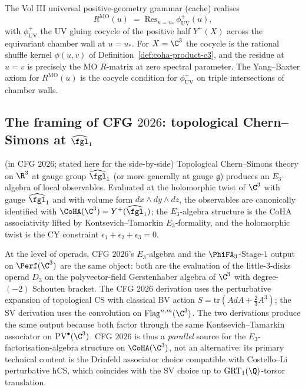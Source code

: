\begin{remark}
\label{rem:mo-r-matrix-residue-wave10}
The Vol III universal positive-geometry grammar (cache) realises
\[
 R^{\mathrm{MO}}(u) \;=\; \mathrm{Res}_{u = u_*}\,
 \phi^+_{\mathrm{UV}}(u),
\]
with $\phi^+_{\mathrm{UV}}$ the UV gluing cocycle of the positive half
$Y^+(X)$ across the equivariant chamber wall at $u = u_*$. For
$X = \C^3$ the cocycle is the rational shuffle kernel $\phi(u, v)$ of
Definition~\ref{def:coha-product-c3}, and the residue at $u = v$ is
precisely the MO $R$-matrix at zero spectral parameter.  The Yang--Baxter
axiom for $R^{\mathrm{MO}}(u)$ is the cocycle condition for
$\phi^+_{\mathrm{UV}}$ on triple intersections of chamber walls.
\end{remark}

\subsection*{The framing of CFG $2026$: topological Chern--Simons at $\widehat{\fgl}_1$}

\begin{theorem}
\label{thm:cfg-2026-tcs-coha-wave10}
\ClaimStatusProvedElsewhere\textup{ (in CFG $2026$; stated here for the
side-by-side)}
Topological Chern--Simons theory on $\R^3$ at gauge group
$\widehat{\fgl}_1$ (or more generally at gauge $\mathfrak g$) produces
an $E_3$-algebra of local observables. Evaluated at the holomorphic
twist of $\C^3$ with gauge $\widehat{\fgl}_1$ and with volume form $dx \wedge dy \wedge dz$,
the observables are canonically identified with $\CoHA(\C^3) =
Y^+(\widehat{\fgl}_1)$; the $E_3$-algebra structure is the CoHA
associativity lifted by Kontsevich--Tamarkin $E_3$-formality, and the
holomorphic twist is the CY constraint $\epsilon_1 + \epsilon_2 +
\epsilon_3 = 0$.
\end{theorem}

\begin{remark}
\label{rem:cfg-2026-operadic-identification-wave10}
At the level of operads, CFG $2026$'s $E_3$-algebra and the
$\PhiFA_3$-Stage-$1$ output on $\Perf(\C^3)$ are the same object:
both are the evaluation of the little-$3$-disks operad $D_3$ on the
polyvector-field Gerstenhaber algebra of $\C^3$ with degree-$(-2)$
Schouten bracket. The CFG $2026$ derivation uses the perturbative
expansion of topological CS with classical BV action
$S = \mathrm{tr}(A dA + \tfrac{2}{3} A^3)$; the SV derivation uses the
convolution on $\mathrm{Flag}^{n, m}(\C^3)$. The two derivations
produce the same output because both factor through the same
Kontsevich--Tamarkin associator on $\mathrm{PV}^\bullet(\C^3)$. CFG $2026$
is thus a \emph{parallel} source for the $E_3$-factorisation-algebra
structure on $\CoHA(\C^3)$, not an alternative: its primary technical
content is the Drinfeld associator choice compatible with
Costello--Li perturbative hCS, which coincides with the SV choice up
to $\mathrm{GRT}_1(\Q)$-torsor translation.
\end{remark}

